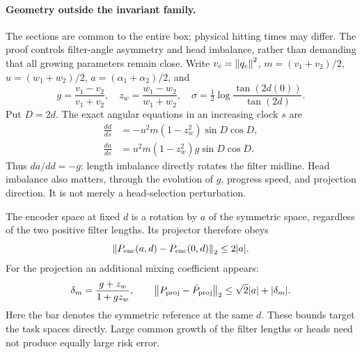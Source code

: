 \paragraph{Geometry outside the invariant family.}
The sections are common to the entire box; physical hitting times may differ. The proof controls filter-angle asymmetry and head imbalance, rather than demanding that all growing parameters remain close. Write $v_c=\left\lVert q_c\right\rVert^2$, $m=(v_1+v_2)/2$, $u=(w_1+w_2)/2$, $a=(\alpha_1+\alpha_2)/2$, and
\begin{equation}
 g=\frac{v_1-v_2}{v_1+v_2},\quad z_w=\frac{w_1-w_2}{w_1+w_2},\quad
 \sigma=\tfrac12\log\frac{\tan(2d(0))}{\tan(2d)}.
\end{equation}
Put $D=2d$. The exact angular equations in an increasing clock $s$ are
\begin{align}
 \frac{dd}{ds}&=-u^2m(1-z_w^2)\sin D\cos D,\nonumber\\
 \frac{da}{ds}&=u^2m(1-z_w^2)g\sin D\cos D.
\end{align}
Thus $da/dd=-g$: length imbalance directly rotates the filter midline. Head imbalance also matters, through the evolution of $g$, progress speed, and projection direction. It is not merely a head-selection perturbation.

The encoder space at fixed $d$ is a rotation by $a$ of the symmetric space, regardless of the two positive filter lengths. Its projector therefore obeys
\begin{equation}
 \left\lVert P_{\rm enc}(a,d)-P_{\rm enc}(0,d)\right\rVert_2\le2|a|.
\end{equation}
For the projection an additional mixing coefficient appears:
\begin{equation}
 \delta_m=\frac{g+z_w}{1+gz_w},\qquad
 \left\lVert P_{\rm proj}-\bar P_{\rm proj}\right\rVert_2\le\sqrt2|a|+|\delta_m|.
\end{equation}
Here the bar denotes the symmetric reference at the same $d$. These bounds target the task spaces directly. Large common growth of the filter lengths or heads need not produce equally large risk error.

